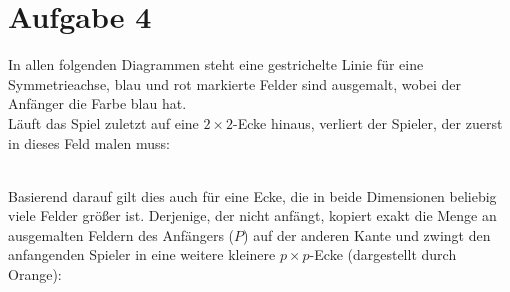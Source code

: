 \documentclass[12pt,a4paper,oneside]{article}
\begin{document}
\section[]{Aufgabe 4}
In allen folgenden Diagrammen steht eine gestrichelte Linie für eine Symmetrieachse, blau und rot markierte Felder sind ausgemalt, wobei der Anfänger die Farbe blau hat. \\[10pt]
Läuft das Spiel zuletzt auf eine $2\times2$-Ecke hinaus, verliert der Spieler, der zuerst in dieses Feld malen muss: \\
\\ Basierend darauf gilt dies auch für eine Ecke, die in beide Dimensionen beliebig viele Felder größer ist. Derjenige, der nicht anfängt, kopiert exakt die Menge an ausgemalten Feldern des Anfängers ($P$) auf der anderen Kante und zwingt den anfangenden Spieler in eine weitere kleinere $p\times p$-Ecke (dargestellt durch Orange):\\
\end{document}

